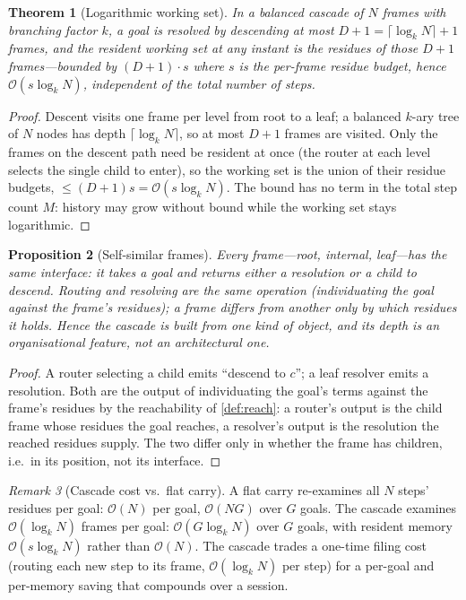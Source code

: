 \documentclass[11pt,a4paper]{article}
\theoremstyle{thmstyle}
\newtheorem{theorem}{Theorem}[section]
\newtheorem{proposition}[theorem]{Proposition}
\theoremstyle{definition}
\theoremstyle{remark}
\newtheorem{remark}[theorem]{Remark}
\begin{document}
\begin{theorem}[Logarithmic working set]
\label{thm:cascade}
In a balanced cascade of $N$ frames with branching factor $k$, a goal is resolved
by descending at most $D+1=\lceil\log_k N\rceil+1$ frames, and the resident
working set at any instant is the residues of those $D+1$ frames---bounded by
$(D+1)\cdot s$ where $s$ is the per-frame residue budget, hence
$\mathcal{O}(s\log_k N)$, independent of the total number of steps.
\end{theorem}

\begin{proof}
Descent visits one frame per level from root to a leaf; a balanced $k$-ary tree
of $N$ nodes has depth $\lceil\log_k N\rceil$, so at most $D+1$ frames are
visited. Only the frames on the descent path need be resident at once (the router
at each level selects the single child to enter), so the working set is the union
of their residue budgets, $\le(D+1)s=\mathcal{O}(s\log_k N)$. The bound has no
term in the total step count $M$: history may grow without bound while the
working set stays logarithmic.
\end{proof}

\begin{proposition}[Self-similar frames]
\label{prop:selfsimilar}
Every frame---root, internal, leaf---has the same interface: it takes a goal and
returns either a resolution or a child to descend. Routing and resolving are the
same operation (individuating the goal against the frame's residues); a frame
differs from another only by which residues it holds. Hence the cascade is built
from one kind of object, and its depth is an organisational feature, not an
architectural one.
\end{proposition}

\begin{proof}
A router selecting a child emits ``descend to $c$''; a leaf resolver emits a
resolution. Both are the output of individuating the goal's terms against the
frame's residues by the reachability of \cref{def:reach}: a router's output is
the child frame whose residues the goal reaches, a resolver's output is the
resolution the reached residues supply. The two differ only in whether the frame
has children, i.e.\ in its position, not its interface.
\end{proof}

\begin{remark}[Cascade cost vs.\ flat carry]
\label{rem:cascade-cost}
A flat carry re-examines all $N$ steps' residues per goal: $\mathcal{O}(N)$ per
goal, $\mathcal{O}(NG)$ over $G$ goals. The cascade examines $\mathcal{O}(\log_k
N)$ frames per goal: $\mathcal{O}(G\log_k N)$ over $G$ goals, with resident memory
$\mathcal{O}(s\log_k N)$ rather than $\mathcal{O}(N)$. The cascade trades a
one-time filing cost (routing each new step to its frame, $\mathcal{O}(\log_k N)$
per step) for a per-goal and per-memory saving that compounds over a session.
\end{remark}
\end{document}
